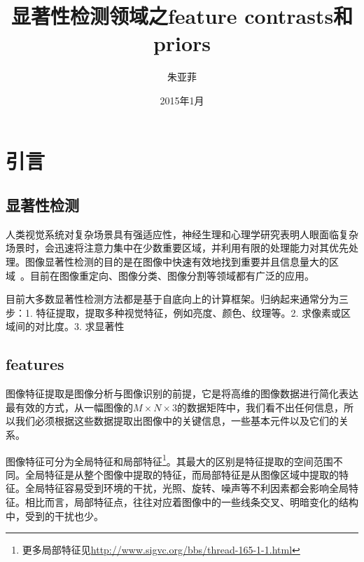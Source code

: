 \documentclass[12pt]{article}
\begin{document}
\title{\vspace{-2em}显著性检测领域之feature contrasts和priors\vspace{-0.7em}}
\author{朱亚菲}
\date{\vspace{-0.7em}2015年1月\vspace{-0.7em}}
\maketitle\thispagestyle{fancy}
\maketitle
\tableofcontents 


\section{引言}

\subsection{显著性检测}

人类视觉系统对复杂场景具有强适应性，神经生理和心理学研究表明人眼面临复杂场景时，会迅速将注意力集中在少数重要区域，并利用有限的处理能力对其优先处理。图像显著性检测的目的是在图像中快速有效地找到重要并且信息量大的区域~\cite{li2013contextual}。目前在图像重定向、图像分类、图像分割等领域都有广泛的应用。

目前大多数显著性检测方法都是基于自底向上的计算框架。归纳起来通常分为三步：1. 特征提取，提取多种视觉特征，例如亮度、颜色、纹理等。2. 求像素或区域间的对比度。3. 求显著性

\subsection{features}

图像特征提取是图像分析与图像识别的前提，它是将高维的图像数据进行简化表达最有效的方式，从一幅图像的$M \times N \times3$的数据矩阵中，我们看不出任何信息，所以我们必须根据这些数据提取出图像中的关键信息，一些基本元件以及它们的关系。

图像特征可分为全局特征和局部特征\footnote{更多局部特征见\url{http://www.sigvc.org/bbs/thread-165-1-1.html}}。其最大的区别是特征提取的空间范围不同。全局特征是从整个图像中提取的特征，而局部特征是从图像区域中提取的特征。全局特征容易受到环境的干扰，光照、旋转、噪声等不利因素都会影响全局特征。相比而言，局部特征点，往往对应着图像中的一些线条交叉、明暗变化的结构中，受到的干扰也少。
\end{document}
